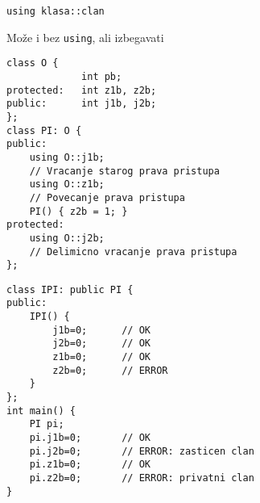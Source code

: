 \documentclass{article}
\newenvironment{xitemize}{%
    
    \itemize
    \larger
}{%
    \enditemize
}
\let\olditemize\itemize
\let\endolditemize\enditemize
\renewenvironment{itemize}{%
    \smaller
    \olditemize
}{%
    \endolditemize
}
\providecommand{\inlinecode}[1]{\texttt{#1}}
\begin{document}
\begin{xitemize}
\begin{itemize}
    \inlinecode{using klasa::clan}
    \item Može i bez \inlinecode{using}, ali izbegavati
    \begin{multicols}{2}
    \begin{lstlisting}
class O {
             int pb;
protected:   int z1b, z2b;
public:      int j1b, j2b;
};
class PI: O {
public:
    using O::j1b;   
    // Vracanje starog prava pristupa
    using O::z1b;   
    // Povecanje prava pristupa
    PI() { z2b = 1; }
protected:
    using O::j2b;   
    // Delimicno vracanje prava pristupa
};
\end{lstlisting}
    \columnbreak
        \begin{lstlisting}
class IPI: public PI {
public:
    IPI() {
        j1b=0;      // OK
        j2b=0;      // OK
        z1b=0;      // OK
        z2b=0;      // ERROR
    }
};
int main() {
    PI pi;
    pi.j1b=0;       // OK
    pi.j2b=0;       // ERROR: zasticen clan
    pi.z1b=0;       // OK
    pi.z2b=0;       // ERROR: privatni clan
}
    \end{lstlisting}
    \end{multicols}
  

\end{itemize}
\end{xitemize}
\end{document}
